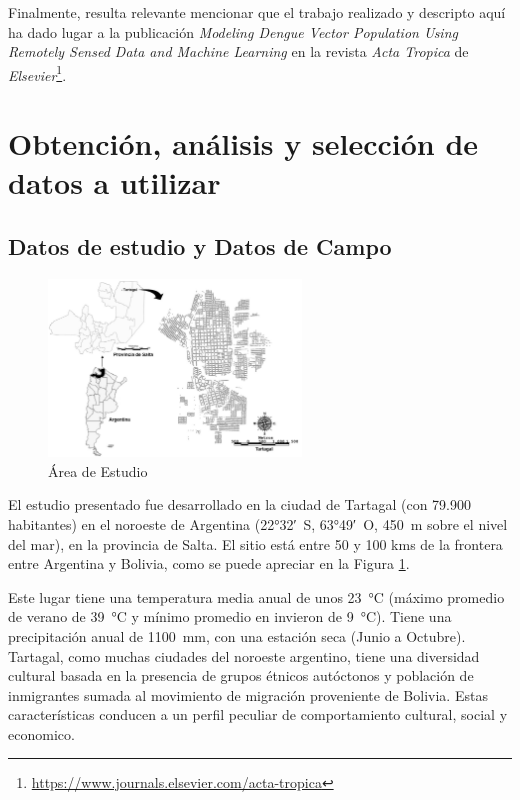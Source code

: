   \par Finalmente, resulta relevante mencionar que el trabajo
    realizado y descripto aquí ha dado lugar a la publicación
    \textit{Modeling Dengue Vector Population Using Remotely Sensed Data and
    Machine Learning} \cite{scavuzzo2018modeling} en la revista \textit{Acta Tropica}
    de \textit{Elsevier}\footnote{\url{https://www.journals.elsevier.com/acta-tropica}}.

\section{Obtención, análisis y selección de datos a utilizar}

\subsection{Datos de estudio y Datos de Campo}
  \begin{figure}[hbt]
  \centering%
  \includegraphics[width=0.6\textwidth]{images/tartagal}%
  \caption{Área de Estudio}\label{fig:tartagal}
  \end{figure}

  \par El estudio presentado fue desarrollado en la ciudad de Tartagal
    (con 79.900 habitantes) en el noroeste de Argentina
    (\ang{22;32;}~S, \ang{63;49;}~O, \SI{450}{\meter} sobre el nivel del mar),
    en la provincia de Salta. El sitio está entre 50 y 100 kms de la frontera
    entre Argentina y Bolivia, como se puede apreciar en la Figura \ref{fig:tartagal}.

  \par Este lugar tiene una temperatura media anual de unos \SI{23}{\degreeCelsius}
    (máximo promedio de verano de \SI{39}{\degreeCelsius} y mínimo promedio en
    invieron de \SI{9}{\degreeCelsius}). Tiene una precipitación anual de
    \SI{1100}{\milli\meter}, con una estación seca (Junio a Octubre).
    Tartagal, como muchas ciudades del noroeste argentino, tiene una diversidad
    cultural basada en la presencia de grupos étnicos autóctonos y población
    de inmigrantes sumada al movimiento de migración proveniente de Bolivia.
    Estas características conducen a un perfil peculiar de comportamiento
    cultural, social y economico.

